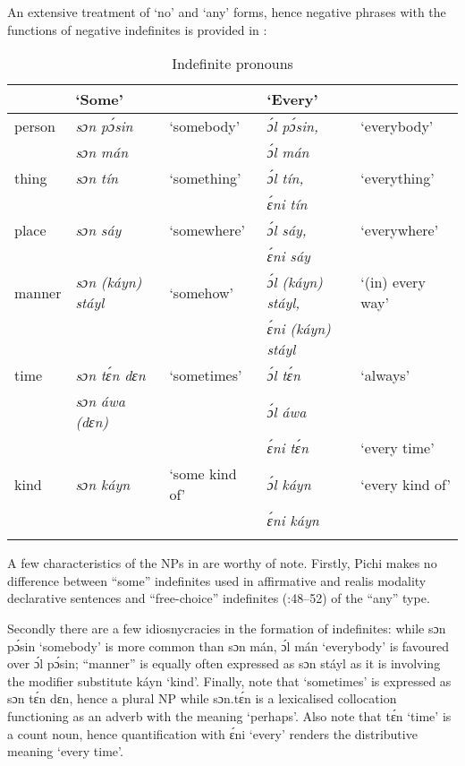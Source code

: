 An extensive treatment of ‘no’ and ‘any’ forms, hence negative phrases with the functions of negative indefinites is provided in :


\begin{table}
\caption{Indefinite pronouns}
\label{tab:key:5.8}

\begin{tabularx}{\textwidth}{lXlXl}
\lsptoprule
 & ‘Some’ &  & ‘Every’ & \\
 \midrule 
person & \itshape sɔn pɔ́sin & ‘somebody’ & \itshape ɔ́l pɔ́sin, & ‘everybody’\\
& \itshape sɔn mán &  & \itshape ɔ́l mán & \\

\tablevspace
thing & \itshape sɔn tín & ‘something’ & \itshape ɔ́l tín, & ‘everything’\\
&  &  & \itshape ɛ́ni tín & \\

\tablevspace
place & \itshape sɔn sáy & ‘somewhere’ & \itshape ɔ́l sáy, & ‘everywhere’\\
&  &  & \itshape ɛ́ni sáy & \\
\tablevspace
manner & \itshape sɔn (káyn) stáyl & ‘somehow’ & \itshape ɔ́l (káyn) stáyl, & ‘(in) every way’\\
&  &  & \itshape ɛ́ni (káyn) stáyl & \\
\tablevspace
time & \itshape sɔn tɛ́n dɛn & ‘sometimes’ & \itshape ɔ́l tɛ́n & ‘always’\\
& \itshape sɔn áwa (dɛn) &  & \itshape ɔ́l áwa & \\
&  &  & \itshape ɛ́ni tɛ́n & ‘every time’\\
\tablevspace
kind & \itshape sɔn káyn & ‘some kind of’ & \itshape ɔ́l káyn & ‘every kind of’\\
&  &  & \itshape ɛ́ni káyn & \\
\lspbottomrule
\end{tabularx}
\end{table}

A few characteristics of the NPs in  are worthy of note. Firstly, Pichi makes no difference between “some” indefinites used in affirmative and realis modality declarative sentences and “free-choice” indefinites (\citealt{Haspelmath1997}:48–52) of the “any” type.


Secondly there are a few idiosnycracies in the formation of indefinites: while sɔn pɔ́sin ‘somebody’ is more common than sɔn mán, ɔ́l mán ‘everybody’ is favoured over ɔ́l pɔ́sin; “manner” is equally often expressed as sɔn stáyl as it is involving the modifier substitute káyn ‘kind’. Finally, note that ‘sometimes’ is expressed as sɔn tɛ́n dɛn, hence a plural NP while sɔn.tɛ́n is a lexicalised collocation functioning as an adverb with the meaning ‘perhaps’. Also note that tɛ́n ‘time’ is a count noun, hence quantification with ɛ́ni ‘every’ renders the distributive meaning ‘every time’. 


